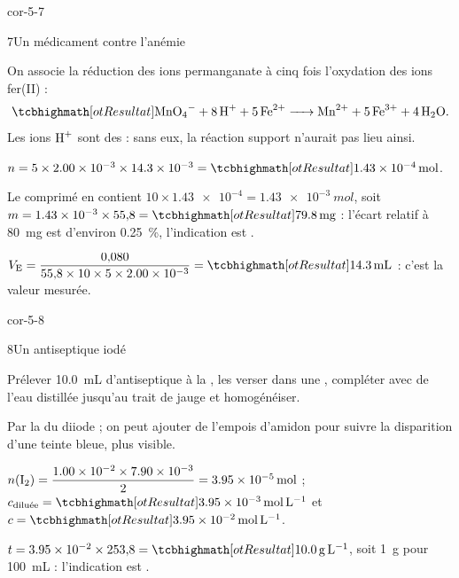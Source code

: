 \begin{blocLivre}{cor-5-7}
\begin{corrige}{7}{Un médicament contre l'anémie}
\begin{questions}
\item On associe la réduction des ions permanganate à cinq fois l'oxydation des ions fer(II) :
\[\res{\ce{MnO4- + 8H+ + 5Fe^{2+} -> Mn^{2+} + 5Fe^{3+} + 4H2O}}.\]
Les ions $\ce{H+}$ sont des  : sans eux, la réaction support n'aurait pas lieu ainsi.
\item $n=5\times\num{2.00e-3}\times\num{14.3e-3}=\res{\qty{1,43e-4}{mol}}$.
\item Le comprimé en contient $10\times\num{1.43e-4}=\qty{1,43e-3}{mol}$, soit $m=\num{1.43e-3}\times55{,}8=\res{\qty{79,8}{mg}}$ : l'écart relatif à
\qty{80}{mg} est d'environ \qty{0,25}{\percent}, l'indication est .
\item $V_\mathrm{E}=\dfrac{0{,}080}{55{,}8\times10\times5\times\num{2.00e-3}}=\res{\qty{14,3}{mL}}$ : c'est la valeur mesurée.
\end{questions}
\end{corrige}
\end{blocLivre}
\begin{blocLivre}{cor-5-8}
\begin{corrige}{8}{Un antiseptique iodé}
\begin{questions}
\item Prélever \qty{10,0}{mL} d'antiseptique à la , les verser dans une , compléter
avec de l'eau distillée jusqu'au trait de jauge et homogénéiser.
\item Par la  du diiode ; on peut ajouter de l'empois d'amidon pour suivre la disparition
d'une teinte bleue, plus visible.
\item $n(\ce{I2})=\dfrac{\num{1.00e-2}\times\num{7.90e-3}}{2}=\qty{3,95e-5}{mol}$ ; $c_\text{diluée}=\res{\qty{3,95e-3}{mol.L^{-1}}}$ et $c=\res{\qty{3,95e-2}{mol.L^{-1}}}$.
\item $t=\num{3.95e-2}\times253{,}8=\res{\qty{10,0}{g.L^{-1}}}$, soit \qty{1}{g} pour \qty{100}{mL} : l'indication est .
\end{questions}
\end{corrige}
\end{blocLivre}
